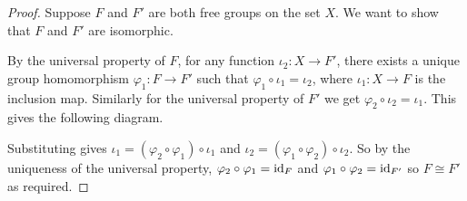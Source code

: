 \begin{proof}
    Suppose \( F\) and \( F' \) are both free groups on the set \( X \). We want to show that \( F \) and \( F' \) are isomorphic.

By the universal property of $F$, for any function $\iota_2: X \to F'$, there exists a unique group homomorphism $\varphi_1: F \to F'$ such that $\varphi_1 \circ \iota_1 = \iota_2$, where $\iota_1: X \to F$ is the inclusion map. Similarly for the universal property of $F'$ we get $\varphi_2 \circ \iota_2 = \iota_1$. This gives the following diagram.

\begin{center}
\end{center}

Substituting gives $\iota_1 = (\varphi_2 \circ \varphi_1) \circ \iota_1$ and $\iota_2 = (\varphi_1 \circ \varphi_2) \circ \iota_2$. So by the uniqueness of the universal property, $\varphi_2 \circ \varphi_1 = \mathrm{id}_{F}$ and $\varphi_1 \circ \varphi_2 = \mathrm{id}_{F'}$ so $F \cong F'$ as required. 
\end{proof}



